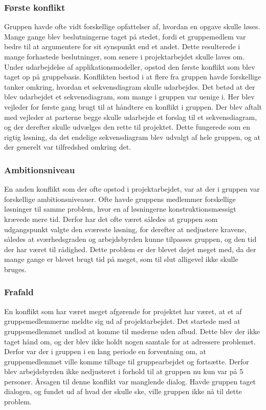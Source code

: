 \subsubsection{Første konflikt}
Gruppen havde ofte vidt forskellige opfattelser af, hvordan en opgave skulle løses. Mange gange blev beslutningerne taget på stedet, fordi et gruppemedlem var bedre til at argumentere for sit synspunkt end et andet. Dette resulterede i mange forhastede beslutninger, som senere i projektarbejdet skulle laves om. Under udarbejdelse af applikationsmodeller, opstod den første konflikt som blev taget op på gruppebasis. Konflikten bestod i at flere fra gruppen havde 
forskellige tanker omkring, hvordan et sekvensdiagram skulle udarbejdes. Det betød at der blev udarbejdet et sekvensdiagram, som mange i gruppen var uenige i. Her blev vejleder for første gang brugt til at håndtere en konflikt i gruppen. Der blev aftalt med vejleder at parterne begge skulle udarbejde et forslag til et sekvensdiagram, og der derefter skulle udvælges den rette til projektet. Dette fungerede som en rigtig løsning, da det endelige sekvensdiagram blev udvalgt af hele gruppen, og at der generelt var tilfredshed omkring det.

\subsubsection{Ambitionsniveau}
En anden konflikt som der ofte opstod i projektarbejdet, var at der i gruppen var forskellige ambitionsniveauer. Ofte havde gruppens medlemmer forskellige løsninger til samme problem, hvor en af løsningerne konstruktionsmæssigt krævede mere tid. Derfor har det ofte været således at gruppen som udgangspunkt valgte den sværeste løsning, for derefter at nedjustere kravene, således at sværhedsgraden og arbejdsbyrden kunne tilpasses gruppen, og den tid der har været til rådighed. Dette problem er der blevet døjet meget med, da der mange gange er blevet brugt tid på meget, som til slut alligevel ikke skulle bruges. 

\subsubsection{Frafald}
En konflikt som har været meget afgørende for projektet har været, at et af gruppemedlemmerne meldte sig ud af projektarbejdet. Det startede med at gruppemedlemmet undlod at komme til møderne uden afbud. Dette blev der ikke taget hånd om, og der blev ikke holdt nogen samtale for at adressere problemet. Derfor var der i gruppen i en lang periode en forventning om, at gruppemedlemmet ville komme tilbage til gruppearbejdet og fortsætte. Derfor blev arbejdsbyrden ikke nedjusteret i forhold til at gruppen nu kun var på 5 personer. Årsagen til denne konflikt var manglende dialog. Havde gruppen taget dialogen, og fundet ud af hvad der skulle ske, ville gruppen ikke nå til dette problem.


